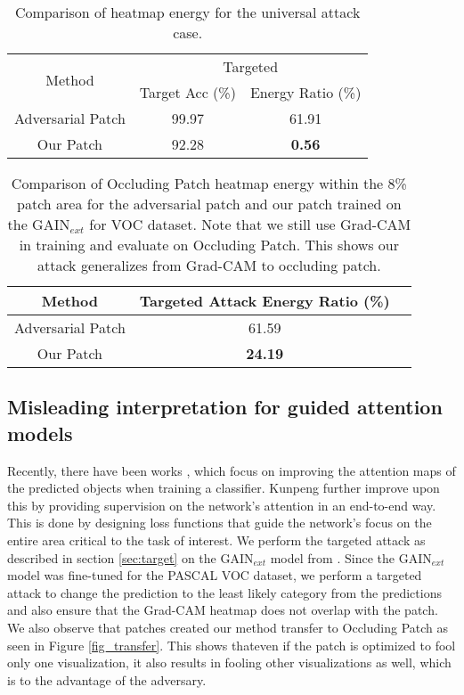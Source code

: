 \documentclass[10pt,twocolumn,letterpaper]{article}
\begin{document}
\begin{table}[!t]
\centering
 \begin{tabular}{||c || c | c ||}
 \hline
 \multirow{2}{*}{Method} & \multicolumn{2}{|c|}{Targeted} \\ [0.5ex]
 \cline{2-3}
 & \footnotesize{Target Acc (\%)} & \footnotesize{Energy Ratio (\%)}\\
 \hline\hline
 Adversarial Patch \cite{brown2017adversarial} &  99.97& 61.91  \\
 \hline
 Our Patch & 92.28 & \textbf{0.56} \\
 \hline
\end{tabular}
\newline
    \caption{Comparison of heatmap energy for the universal attack case.
    }
    \label{fig:comparison_patch_univ_heatmap_GAIN}
\end{table}
\begin{table}[!t]
\centering
 \begin{tabular}{||c || c | c ||}
 \hline
 Method & \small{Targeted Attack Energy Ratio (\%)}\\[0.5ex]
 \hline\hline
 Adversarial Patch \cite{brown2017adversarial} & 61.59  \\
 \hline
 Our Patch & \textbf{24.19}  \\
 \hline
\end{tabular}
\newline
    \caption{Comparison of Occluding Patch \cite{zhou2014object} heatmap energy within the 8\% patch area for the adversarial patch \cite{brown2017adversarial} and our patch trained on the GAIN{$_{ext}$} \cite{kunpeng2018gain} for VOC dataset. Note that we still use Grad-CAM in training and evaluate on Occluding Patch. This shows our attack generalizes from Grad-CAM to occluding patch.
    }
    \label{table:comparison_patch_transfer_heatmap_GAIN}
\end{table}
\subsection{Misleading interpretation for guided attention models}
\label{improv_adv_exmaples_attention_models}
Recently, there have been works \cite{singh2017hide}, \cite{wei2017object} which focus on improving the attention maps of the predicted objects when training a classifier. Kunpeng \etal \cite{kunpeng2018gain} further improve upon this by providing supervision on the network's attention in an end-to-end way. This is done by designing loss functions that guide the network's focus on the entire area critical to the task of interest. We perform the targeted attack as described in section \ref{sec:target} on the GAIN{$_{ext}$} model from \cite{kunpeng2018gain}. Since the GAIN{$_{ext}$} model was fine-tuned for the PASCAL VOC dataset, we perform a targeted attack to change the prediction to the least likely category from the predictions and also ensure that the Grad-CAM heatmap does not overlap with the patch. We also observe that patches created our method transfer to Occluding Patch \cite{zhou2016learning} as seen in Figure \ref{fig_transfer}.  This shows thateven if the patch is optimized to fool only one visualization, it also results in fooling other visualizations as well, which is to the advantage of the adversary.
\end{document}
